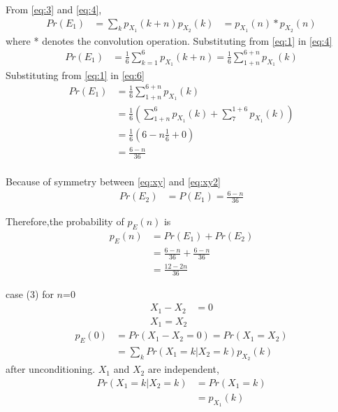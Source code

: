 \documentclass[journal,12pt,twocolumn]{IEEEtran}
\begin{document}
From \eqref{eq:3} and \eqref{eq:4},
\begin{align}
  Pr(E_1) &=\sum_{k}p_{X_{1}}(k+n)p_{X_{2}}(k)
  &= p_{X_{1}}(n)*p_{X_{2}}(n)\label{eq:5}
\end{align}
where * denotes the convolution operation. Substituting from \eqref{eq:1} in \eqref{eq:4}
\begin{align}
  Pr(E_1) &=\frac{1}{6}\sum_{k=1}^{6}p_{X_{1}}(k+n)=\frac{1}{6}\sum_{1+n}^{6+n}p_{X_{1}}(k)\label{eq:6}
\end{align}
Substituting from \eqref{eq:1} in \eqref{eq:6}
\begin{align}
  Pr(E_1) &=\frac{1}{6}\sum_{1+n}^{6+n}p_{X_{1}}(k)\nonumber\\
  &=\frac{1}{6}(\sum_{1+n}^{6}p_{X_{1}}(k)+\sum_{7}^{1+6}p_{X_{1}}(k))\nonumber\\
   &=\frac{1}{6}(6-n\frac{1}{6}+0)\nonumber\\
    &=\frac{6-n}{36}\nonumber\\
\end{align}
	 


Because of symmetry between \eqref{eq:xy} and \eqref{eq:xy2} \\
\begin{align}
	Pr(E_2)&=P(E_1)=\frac{6-n}{36} \nonumber
\end{align} 


Therefore,the probability of $p_E(n)$ is
\begin{align}
	p_E(n)&=Pr(E_1)+Pr(E_2)\nonumber\\
	&=\frac{6-n}{36}+\frac{6-n}{36}\nonumber\\
	&=\frac{12-2n}{36}\nonumber
\end{align} 

case (3) for $n$=0
\begin{align}
	X_1 - X_2 &= 0 \nonumber\\
	X_1=X_2\label{eq:xy0} 
\end{align} 
\begin{align}
    p_E(0) &= Pr (X_1-X_2 = 0) = Pr (X_1 = X_2 )\nonumber\\
   	&=\sum_{k} Pr(X_1=k|X_2=k)p_{X_{2}}(k)\label{eq:03}
\end{align}
after unconditioning. $X_1$ and $X_2$ are independent,
\begin{align}
	Pr(X_1=k|X_2=k)&=Pr(X_1=k)\nonumber\\
                &=p_{X_{1}}(k)\label{eq:04}
\end{align} 
\end{document}
